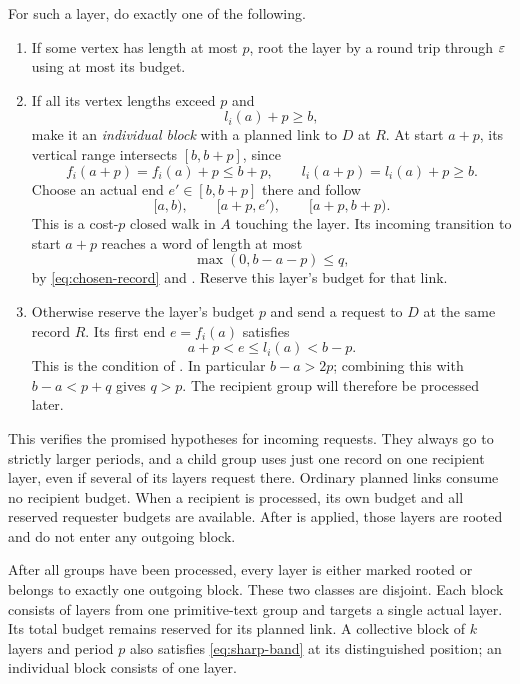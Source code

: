 For such a layer, do exactly one of the following.
\begin{enumerate}[label=\textup{(\roman*)}]
\item If some vertex has length at most $p$, root the layer by a round trip through $\varepsilon$ using at most its budget.
\item If all its vertex lengths exceed $p$ and
\begin{equation}\label{eq:single-test}
l_i(a)+p\ge b,
\end{equation}
make it an \emph{individual block} with a planned link to $D$ at $R$. At start $a+p$, its vertical range intersects $[b,b+p]$, since
\[
f_i(a+p)=f_i(a)+p\le b+p,
\qquad l_i(a+p)=l_i(a)+p\ge b.
\]
Choose an actual end $e'\in[b,b+p]$ there and follow
\begin{equation}\label{eq:individual-list}
[a,b),\qquad[a+p,e'),\qquad[a+p,b+p).
\end{equation}
This is a cost-$p$ closed walk in $A$ touching the layer. Its incoming transition to start $a+p$ reaches a word of length at most
\begin{equation}\label{eq:single-short}
\max(0,b-a-p)\le q,
\end{equation}
by \eqref{eq:chosen-record} and . Reserve this layer's budget for that link.
\item Otherwise reserve the layer's budget $p$ and send a request to $D$ at the same record $R$. Its first end $e=f_i(a)$ satisfies
\begin{equation}\label{eq:outgoing-request}
a+p<e\le l_i(a)<b-p.
\end{equation}
This is the condition of . In particular $b-a>2p$; combining this with $b-a<p+q$ gives $q>p$. The recipient group will therefore be processed later.
\end{enumerate}

This verifies the promised hypotheses for incoming requests. They always go to strictly larger periods, and a child group uses just one record on one recipient layer, even if several of its layers request there. Ordinary planned links consume no recipient budget. When a recipient is processed, its own budget and all reserved requester budgets are available. After  is applied, those layers are rooted and do not enter any outgoing block.

\begin{proposition}\label{prop:partition}
After all groups have been processed, every layer is either marked rooted or belongs to exactly one outgoing block. These two classes are disjoint. Each block consists of layers from one primitive-text group and targets a single actual layer. Its total budget remains reserved for its planned link. A collective block of $k$ layers and period $p$ also satisfies \eqref{eq:sharp-band} at its distinguished position; an individual block consists of one layer.
\end{proposition}

